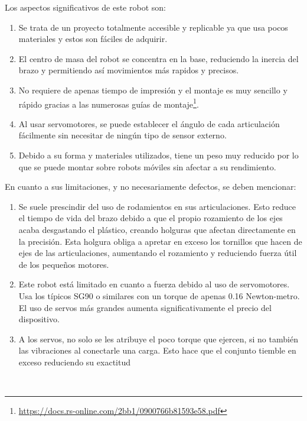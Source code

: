 \begin{itemize}
    \newpage
    Los aspectos significativos de este robot son:
    \begin{enumerate}
        \item Se trata de un proyecto totalmente accesible y replicable ya que usa pocos materiales y estos son fáciles de adquirir.
        \item El centro de masa del robot se concentra en la base, reduciendo la inercia del brazo y permitiendo así movimientos más rapidos y precisos.
        \item No requiere de apenas tiempo de impresión y el montaje es muy sencillo y rápido gracias a las numerosas guías de 
        montaje\footnote{\url{https://docs.rs-online.com/2bb1/0900766b81593e58.pdf}}.
        \item Al usar servomotores, se puede establecer el ángulo de cada articulación fácilmente sin necesitar de ningún tipo de sensor externo.
        \item Debido a su forma y materiales utilizados, tiene un peso muy reducido por lo que se puede montar sobre robots móviles sin afectar a 
        su rendimiento.
    \end{enumerate}
    En cuanto a sus limitaciones, y no necesariamente defectos, se deben mencionar:
    \begin{enumerate}
    \item Se suele prescindir del uso de rodamientos en sus articulaciones. Esto reduce el tiempo de vida del brazo debido a que el propio rozamiento 
    de los ejes acaba desgastando el plástico, creando holguras que afectan directamente en la precisión. Esta holgura obliga a apretar en exceso los tornillos 
    que hacen de ejes de las articulaciones, aumentando el rozamiento y reduciendo fuerza útil de los pequeños motores.
    \item Este robot está limitado en cuanto a fuerza debido al uso de servomotores. Usa los típicos SG90 o similares con un torque de apenas 
    0.16 Newton-metro. El uso de servos más grandes aumenta significativamente el precio del dispositivo. 
    \item A los servos, no solo se les atribuye el poco torque que ejercen, si no también las vibraciones al conectarle una carga. Esto hace 
    que el conjunto tiemble en exceso reduciendo su exactitud
    \end{enumerate}
\end{itemize}\
\vspace{1cm}
